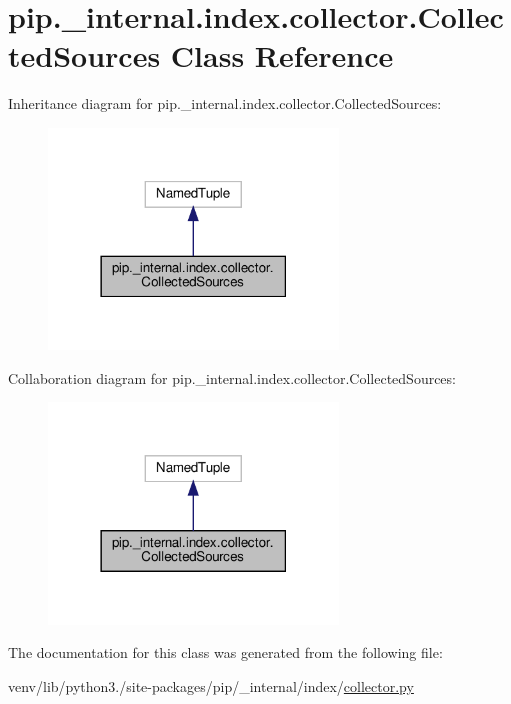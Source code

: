 \hypertarget{classpip_1_1__internal_1_1index_1_1collector_1_1CollectedSources}{}\section{pip.\+\_\+internal.\+index.\+collector.\+Collected\+Sources Class Reference}
\label{classpip_1_1__internal_1_1index_1_1collector_1_1CollectedSources}


Inheritance diagram for pip.\+\_\+internal.\+index.\+collector.\+Collected\+Sources\+:
\nopagebreak
\begin{figure}[H]
\begin{center}
\leavevmode
\includegraphics[width=218pt]{classpip_1_1__internal_1_1index_1_1collector_1_1CollectedSources__inherit__graph}
\end{center}
\end{figure}


Collaboration diagram for pip.\+\_\+internal.\+index.\+collector.\+Collected\+Sources\+:
\nopagebreak
\begin{figure}[H]
\begin{center}
\leavevmode
\includegraphics[width=218pt]{classpip_1_1__internal_1_1index_1_1collector_1_1CollectedSources__coll__graph}
\end{center}
\end{figure}


The documentation for this class was generated from the following file\+:\begin{DoxyCompactItemize}
\item 
venv/lib/python3./site-\/packages/pip/\+\_\+internal/index/\hyperlink{collector_8py}{collector.\+py}\end{DoxyCompactItemize}
